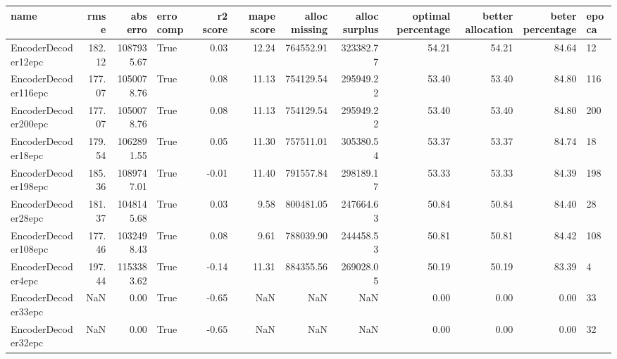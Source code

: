 \begin{tabular}{lrrlrrrrrrrl}
\toprule
name & rmse & abs erro & erro comp & r2 score & mape score & alloc missing & alloc surplus & optimal percentage & better allocation & beter percentage & epoca \\
\midrule
EncoderDecoder12epc & 182.12 & 1087935.67 & True & 0.03 & 12.24 & 764552.91 & 323382.77 & 54.21 & 54.21 & 84.64 & 12 \\
EncoderDecoder116epc & 177.07 & 1050078.76 & True & 0.08 & 11.13 & 754129.54 & 295949.22 & 53.40 & 53.40 & 84.80 & 116 \\
EncoderDecoder200epc & 177.07 & 1050078.76 & True & 0.08 & 11.13 & 754129.54 & 295949.22 & 53.40 & 53.40 & 84.80 & 200 \\
EncoderDecoder18epc & 179.54 & 1062891.55 & True & 0.05 & 11.30 & 757511.01 & 305380.54 & 53.37 & 53.37 & 84.74 & 18 \\
EncoderDecoder198epc & 185.36 & 1089747.01 & True & -0.01 & 11.40 & 791557.84 & 298189.17 & 53.33 & 53.33 & 84.39 & 198 \\
EncoderDecoder28epc & 181.37 & 1048145.68 & True & 0.03 & 9.58 & 800481.05 & 247664.63 & 50.84 & 50.84 & 84.40 & 28 \\
EncoderDecoder108epc & 177.46 & 1032498.43 & True & 0.08 & 9.61 & 788039.90 & 244458.53 & 50.81 & 50.81 & 84.42 & 108 \\
EncoderDecoder4epc & 197.44 & 1153383.62 & True & -0.14 & 11.31 & 884355.56 & 269028.05 & 50.19 & 50.19 & 83.39 & 4 \\
EncoderDecoder33epc & NaN & 0.00 & True & -0.65 & NaN & NaN & NaN & 0.00 & 0.00 & 0.00 & 33 \\
EncoderDecoder32epc & NaN & 0.00 & True & -0.65 & NaN & NaN & NaN & 0.00 & 0.00 & 0.00 & 32 \\
\bottomrule
\end{tabular}
